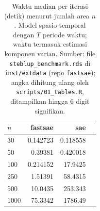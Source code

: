 \begin{table}[htbp]
\centering
\caption{Waktu median per iterasi (detik) menurut jumlah area $n$. Model spasio-temporal dengan $T$ periode waktu; waktu termasuk estimasi komponen varian. Sumber: file \texttt{steblup\_benchmark.rds} di \texttt{inst/extdata} (repo \texttt{fastsae}); angka dihitung ulang oleh \texttt{scripts/01\_tables.R}, ditampilkan hingga 6 digit signifikan.}
\label{tab:time-stfh}
\small
\begin{tabular}{lrrr}
\toprule
$n$ & fastsae & sae \\
\midrule
30 & 0.142723 & 0.118558 \\
50 & 0.39381 & 0.420018 \\
100 & 0.214152 & 17.9425 \\
250 & 1.51391 & 58.4315 \\
500 & 10.0435 & 253.343 \\
1000 & 75.3342 & 1786.49 \\
\bottomrule
\end{tabular}
\end{table}

